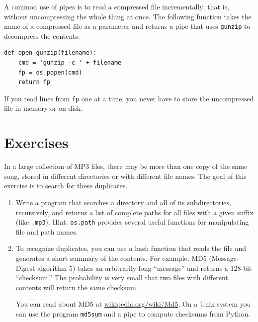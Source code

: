 \documentclass[10pt]{book}
\begin{document}
A common use of pipes is to read a compressed file incrementally;
that is, without uncompressing the whole thing at once.  The
following function takes the name of a compressed file as a
parameter and returns a pipe that uses {\tt gunzip} to decompress
the contents:

\beforeverb
\begin{verbatim}
def open_gunzip(filename):
    cmd = 'gunzip -c ' + filename
    fp = os.popen(cmd)
    return fp
\end{verbatim}
\afterverb
%
If you read lines from {\tt fp} one at a time, you never have
to store the uncompressed file in memory or on disk.

\section{Exercises}

\begin{ex}
\label{checksum}


In a large collection of MP3 files, there may be more than one
copy of the same song, stored in different directories or with
different file names.  The goal of this exercise is to search for
these duplicates.

\begin{enumerate}

\item Write a program that searches a directory and all of its
subdirectories, recursively, and returns a list of complete paths
for all files with a given suffix (like {\tt .mp3}).
Hint: {\tt os.path} provides several useful functions for
manipulating file and path names.


\item To recognize duplicates, you can use a hash function that
reads the file and generates a short summary
of the contents.  For example,
MD5 (Message-Digest algorithm 5) takes an arbitrarily-long
``message'' and returns a 128-bit ``checksum.''  The probability
is very small that two files with different contents will
return the same checksum.

You can read about MD5 at \url{wikipedia.org/wiki/Md5}.  On
a Unix system you can use the program {\tt md5sum} and a pipe to
compute checksums from Python.


\end{enumerate}

\end{ex}
\end{document}
